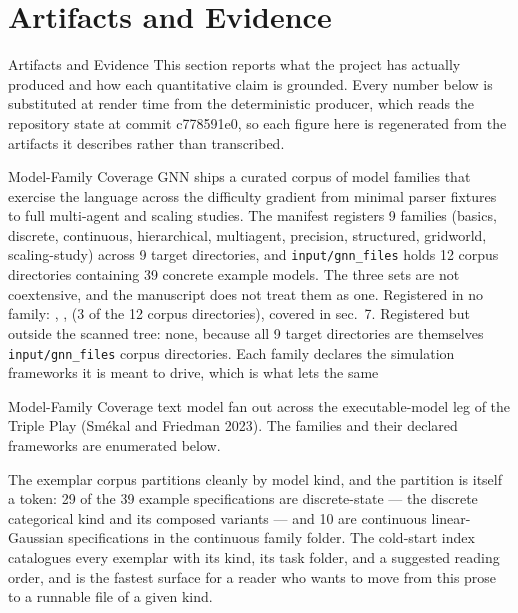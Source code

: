 \documentclass[
  ignorenonframetext,
]{beamer}
\author{\texorpdfstring{}{}}
\date{}
\newcounter{none} %
\begin{document}
\section{Artifacts and Evidence}\label{sec:artifacts_evidence}

\begin{frame}[allowframebreaks]{Artifacts and Evidence}
This section reports what the project has actually produced and how each
quantitative claim is grounded. Every number below is substituted at
render time from the deterministic producer, which reads the repository
state at commit c778591e0, so each figure here is regenerated from the
artifacts it describes rather than transcribed.
\end{frame}

\begin{frame}{Model-Family Coverage}
\protect{}\label{model-family-coverage}
GNN ships a curated corpus of model families that exercise the language
across the difficulty gradient from minimal parser fixtures to full
multi-agent and scaling studies. The manifest registers 9 families
(basics, discrete, continuous, hierarchical, multiagent, precision,
structured, gridworld, scaling-study) across 9 target directories, and
\texttt{input/gnn\_files} holds 12 corpus directories containing 39
concrete example models. The three sets are not coextensive, and the
manuscript does not treat them as one. Registered in no family:
, ,
 (3 of the 12 corpus directories),
covered in sec.~7. Registered but outside
the scanned tree: none, because all 9 target directories are themselves
\texttt{input/gnn\_files} corpus directories. Each family declares the
simulation frameworks it is meant to drive, which is what lets the same
\end{frame}

\begin{frame}{Model-Family Coverage}
text model fan out across the executable-model leg of the Triple Play
(Smékal and Friedman 2023). The families and their declared frameworks
are enumerated below.

The exemplar corpus partitions cleanly by model kind, and the partition
is itself a token: 29 of the 39 example specifications are
discrete-state --- the discrete categorical kind and its composed
variants --- and 10 are continuous linear-Gaussian specifications in the
continuous family folder. The cold-start index
 catalogues every exemplar with its
kind, its task folder, and a suggested reading order, and is the fastest
surface for a reader who wants to move from this prose to a runnable
file of a given kind.

\end{frame}
\end{document}
